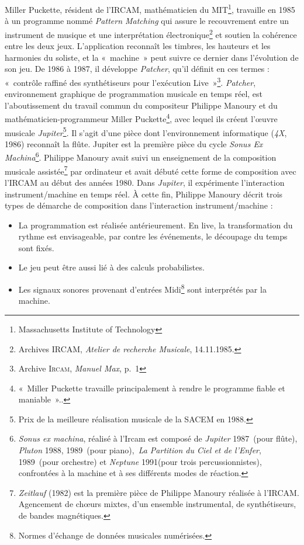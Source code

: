 \documentclass{FramateX}
\begin{document}
\begin{refsection}
Miller Puckette, résident de l'IRCAM, mathématicien du
MIT\footnote{Massachusetts Institute of Technology}, travaille en
1985 à un programme nommé \textit{Pattern Matching} qui assure le recouvrement
entre un instrument de musique et une interprétation
électronique\footnote{Archives IRCAM, \textit{Atelier de recherche Musicale},
14.11.1985.} et soutien la cohérence entre les deux jeux. L'application
reconnaît les timbres, les hauteurs et les harmonies du soliste, et la
«~machine~» peut suivre ce dernier dans l'évolution de son jeu. De 1986
à 1987, il développe \textit{Patcher}, qu'il définit en ces termes : «~contrôle
raffiné des synthétiseurs pour l'exécution Live~»\footnote{Archive
\textsc{Ircam}, \textit{Manuel Max}, p.~1}. \textit{Patcher}, environnement graphique de
programmation musicale en temps réel, est l'aboutissement du travail
commun du compositeur Philippe Manoury et du mathématicien-programmeur
Miller Puckette\footnote{«~Miller Puckette travaille principalement à
rendre le programme fiable et maniable~».\cite[p.~40]{Ircam1995}.}, avec lequel ils créent l'œuvre musicale
\textit{Jupiter}\footnote{Prix de la meilleure réalisation musicale de la
SACEM en 1988.}. Il s'agit d'une
pièce dont l'environnement informatique (\textit{4X}, 1986)
reconnaît la flûte. Jupiter est la première pièce du cycle \textit{Sonus Ex
Machina}\footnote{\textit{Sonus ex machina}, réalisé à l'Ircam est composé de
\textit{Jupiter} 1987~(pour flûte), \textit{Pluton} 1988, 1989~(pour piano),~\textit{La Partition
du Ciel et de l'Enfer}, 1989~(pour orchestre) et \textit{Neptune} 1991(pour trois
percussionnistes), confrontées à la machine et à ses différents modes
de réaction.}. Philippe Manoury avait suivi un enseignement de la
composition musicale assistée\footnote{\textit{Zeitlauf} (1982) est la
première pièce de Philippe Manoury réalisée à l'IRCAM. Agencement de
chœurs mixtes, d'un ensemble instrumental, de synthétiseurs, de bandes
magnétiques.} par ordinateur et avait débuté cette forme de
composition avec l'IRCAM au début des années 1980. Dans \textit{Jupiter}, il
expérimente l'interaction instrument/machine en temps réel. À cette
fin, Philippe Manoury décrit trois types de démarche de composition
dans l'interaction instrument/machine : 

\begin{itemize}
\item La programmation est réalisée antérieurement. En live, la
transformation du rythme est envisageable, par contre les événements,
le découpage du temps sont fixés.
\item Le jeu peut être aussi lié à des calculs probabilistes.
\item Les signaux sonores provenant d'entrées Midi\footnote{Normes
d'échange de données musicales numérisées.} sont
interprétés par la machine.
\end{itemize}


\end{refsection}
\end{document}
